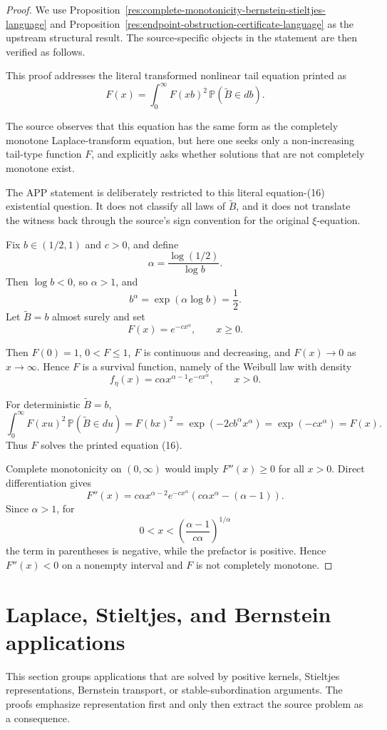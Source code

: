 \documentclass[11pt]{article}
\numberwithin{equation}{section}
\theoremstyle{definition}
\theoremstyle{remark}
\newcommand{\1}{\mathbf 1}
\begin{document}
\begin{proof}
We use Proposition~\ref{res:complete-monotonicity-bernstein-stieltjes-language} and Proposition~\ref{res:endpoint-obstruction-certificate-language} as the upstream structural result. The source-specific objects in the statement are then verified as follows.

This proof addresses the literal transformed nonlinear tail equation printed as
\[
F(x)=\int_0^\infty F(xb)^2\,\mathbb P(\widetilde B\in db).
\]

The source observes that this equation has the same form as the completely
monotone Laplace-transform equation, but here one seeks only a non-increasing
tail-type function \(F\), and explicitly asks whether solutions that are not
completely monotone exist.

The APP statement is deliberately restricted to this literal equation-(16)
existential question. It does not classify all laws of \(\widetilde B\), and it
does not translate the witness back through the source's sign convention for
the original \(\xi\)-equation.

Fix \(b\in(1/2,1)\) and \(c>0\), and define
\[
\alpha=\frac{\log(1/2)}{\log b}.
\]
Then \(\log b<0\), so \(\alpha>1\), and
\[
b^\alpha=\exp(\alpha\log b)=\frac12.
\]
Let \(\widetilde B=b\) almost surely and set
\[
F(x)=e^{-cx^\alpha},\qquad x\ge0.
\]

Then \(F(0)=1\), \(0<F\le1\), \(F\) is continuous and decreasing, and
\(F(x)\to0\) as \(x\to\infty\). Hence \(F\) is a survival function, namely of
the Weibull law with density
\[
f_\eta(x)=c\alpha x^{\alpha-1}e^{-cx^\alpha},\qquad x>0.
\]

For deterministic \(\widetilde B=b\),
\[
\int_0^\infty F(xu)^2\,\mathbb P(\widetilde B\in du)
=F(bx)^2
=\exp(-2cb^\alpha x^\alpha)
=\exp(-cx^\alpha)
=F(x).
\]
Thus \(F\) solves the printed equation (16).

Complete monotonicity on \((0,\infty)\) would imply \(F''(x)\ge0\) for all
\(x>0\). Direct differentiation gives
\[
F''(x)=c\alpha x^{\alpha-2}e^{-cx^\alpha}
\left(c\alpha x^\alpha-(\alpha-1)\right).
\]
Since \(\alpha>1\), for
\[
0<x<\left(\frac{\alpha-1}{c\alpha}\right)^{1/\alpha}
\]
the term in parentheses is negative, while the prefactor is positive. Hence
\(F''(x)<0\) on a nonempty interval and \(F\) is not completely monotone.
\end{proof}

\section{Laplace, Stieltjes, and Bernstein applications}
\label{sec:laplace-stieltjes-and-bernstein-applications}
This section groups applications that are solved by positive kernels, Stieltjes representations, Bernstein transport, or stable-subordination arguments.  The proofs emphasize representation first and only then extract the source problem as a consequence.
\end{document}
